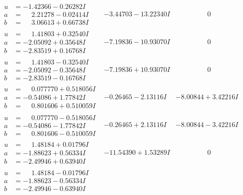 \documentclass[1p]{elsarticle_modified}
\theoremstyle{definition}
\begin{document}
$$\begin{array}{c|c|c}
 \hline 
\begin{aligned}
u &= -1.42366 - 0.26282 I \\
a &= \phantom{-}2.21278 - 0.02414 I \\
b &= \phantom{-}3.06613 + 0.66738 I\end{aligned}
 & -3.44703 - 13.22340 I & \phantom{-0.000000 } 0 \\ \hline\begin{aligned}
u &= \phantom{-}1.41803 + 0.32540 I \\
a &= -2.05092 + 0.35648 I \\
b &= -2.83519 + 0.16768 I\end{aligned}
 & -7.19836 - 10.93070 I & \phantom{-0.000000 } 0 \\ \hline\begin{aligned}
u &= \phantom{-}1.41803 - 0.32540 I \\
a &= -2.05092 - 0.35648 I \\
b &= -2.83519 - 0.16768 I\end{aligned}
 & -7.19836 + 10.93070 I & \phantom{-0.000000 } 0 \\ \hline\begin{aligned}
u &= \phantom{-}0.077770 + 0.518056 I \\
a &= -0.54086 + 1.77842 I \\
b &= \phantom{-}0.801606 + 0.510059 I\end{aligned}
 & -0.26465 - 2.13116 I & -8.00844 + 3.42216 I \\ \hline\begin{aligned}
u &= \phantom{-}0.077770 - 0.518056 I \\
a &= -0.54086 - 1.77842 I \\
b &= \phantom{-}0.801606 - 0.510059 I\end{aligned}
 & -0.26465 + 2.13116 I & -8.00844 - 3.42216 I \\ \hline\begin{aligned}
u &= \phantom{-}1.48184 + 0.01796 I \\
a &= -1.88623 + 0.56334 I \\
b &= -2.49946 + 0.63940 I\end{aligned}
 & -11.54390 + 1.53289 I & \phantom{-0.000000 } 0 \\ \hline\begin{aligned}
u &= \phantom{-}1.48184 - 0.01796 I \\
a &= -1.88623 - 0.56334 I \\
b &= -2.49946 - 0.63940 I\end{aligned}

\end{array}$$
\end{document}
